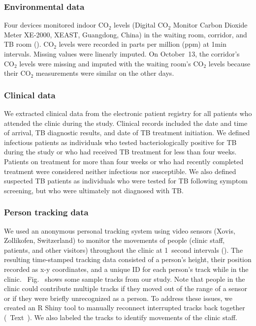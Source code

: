 \documentclass[fleqn,11pt]{wlscirep}
\begin{document}
\subsubsection{Environmental data}

Four devices monitored indoor CO$_2$ levels (Digital CO$_2$ Monitor Carbon Dioxide Meter XE-2000, XEAST, Guangdong, China) in the waiting room, corridor, and TB room (). CO$_2$ levels were recorded in parts per million (ppm) at 1min intervals. Missing values were linearly imputed. On October~13, the corridor's CO$_2$ levels were missing and imputed with the waiting room's CO$_2$ levels because their CO$_2$ measurements were similar on the other days.    

\subsubsection{Clinical data}

We extracted clinical data from the electronic patient registry for all patients who attended the clinic during the study. Clinical records included the date and time of arrival, TB diagnostic results, and date of TB treatment initiation. We defined infectious patients as individuals who tested bacteriologically positive for TB during the study or who had received TB treatment for less than four weeks. Patients on treatment for more than four weeks or who had recently completed treatment were considered neither infectious nor susceptible. We also defined suspected TB patients as individuals who were tested for TB following symptom screening, but who were ultimately not diagnosed with TB. 

\subsubsection{Person tracking data}

We used an anonymous personal tracking system using video sensors (Xovis, Zollikofen, Switzerland) to monitor the movements of people (clinic staff, patients, and other visitors) throughout the clinic at 1~second intervals (). The resulting time-stamped tracking data consisted of a person’s height, their position recorded as x-y coordinates, and a unique ID for each person's track while in the clinic. \supp~Fig.~ shows some sample tracks from our study. Note that people in the clinic could contribute multiple tracks if they moved out of the range of a sensor or if they were briefly unrecognized as a person. To address these issues, we created an R Shiny tool to manually reconnect interrupted tracks back together (\supp~Text~). We also labeled the tracks to identify movements of the clinic staff.  
\end{document}

